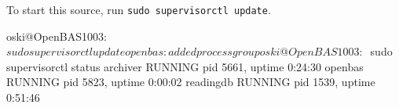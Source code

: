 \documentclass[11pt]{article}
\begin{document}
To start this source, run \verb`sudo supervisorctl update`.

\begin{shell-sessioncode}
oski@OpenBAS1003:~$ sudo supervisorctl update
openbas: added process group
oski@OpenBAS1003:~$ sudo supervisorctl status
archiver                         RUNNING    pid 5661, uptime 0:24:30
openbas                          RUNNING    pid 5823, uptime 0:00:02
readingdb                        RUNNING    pid 1539, uptime 0:51:46
\end{shell-sessioncode}
\end{document}
